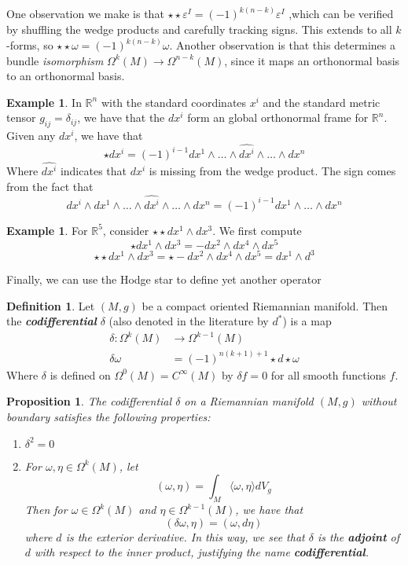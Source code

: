 \documentclass[psamsfonts]{amsart}
\newtheorem{prop}[thm]{Proposition}
\theoremstyle{definition}
\newtheorem{defn}[thm]{Definition}
\newtheorem{exmp}[thm]{Example}
\theoremstyle{remark}
\newcommand{\R}{\mathbb{R}}
\newcommand{\ib}[1]{\textbf{\textit{#1}}}
\begin{document}
One observation we make is that $\star\star \varepsilon^I = (-1)^{k(n-k)}\varepsilon^I$ ,which can be verified by shuffling the wedge products and carefully tracking signs. This extends to all $k$-forms, so $\star \star\omega = (-1)^{k(n-k)}\omega$. Another observation is that this determines a bundle \emph{isomorphism} $\Omega^k(M) \to \Omega^{n-k}(M)$, since it maps an orthonormal basis to an orthonormal basis.
\begin{exmp}
In $\R^n$ with the standard coordinates $x^i$  and the standard metric tensor  $g_{ij} = \delta_{ij}$, we have that the $dx^i$ form an global orthonormal frame for $\R^n$. Given any $dx^i$, we have that 
$$\star dx^i =  (-1)^{i-1} dx^1 \wedge \ldots \wedge \hat{dx^i} \wedge \ldots \wedge dx^n $$
Where $\hat{dx^i}$ indicates that $dx^i$ is missing  from the wedge product. The sign comes from the fact that 
$$dx^i \wedge dx^1 \wedge \ldots \wedge \hat{dx^i} \wedge \ldots \wedge dx^n = (-1)^{i-1} dx^1\wedge \ldots \wedge dx^n$$
\end{exmp}
%
\begin{exmp}
For $\R^5$,  consider $\star\star dx^1 \wedge dx^3$. We first compute
$$\star dx^1 \wedge dx^3 = -dx^2 \wedge dx^4 \wedge dx^5 $$
$$\star\star dx^1\wedge dx^3 = \star -dx^2 \wedge dx^4 \wedge dx^5 = dx^1 \wedge d^3$$
\end{exmp}
%
Finally, we can use the Hodge star to define yet another operator
\begin{defn}
Let $(M,g)$ be a compact oriented Riemannian manifold. Then the \ib{codifferential} $\delta$ (also denoted in the literature by $d^*$) is a map
\begin{align*}
\delta: \Omega^k(M) &\to \Omega^{k-1}(M) \\
\delta \omega &= (-1)^{n(k+1)+1}\star d \star \omega
\end{align*}
Where $\delta$ is  defined on $\Omega^0(M) = C^\infty(M)$ by  $\delta f = 0$ for all smooth functions $f$.
\end{defn}
%
\begin{prop}
The codifferential $\delta$ on  a Riemannian manifold $(M,g)$ without boundary satisfies the following properties:
\begin{enumerate}
\item $\delta^2 = 0$ 
\item For $\omega,\eta \in \Omega^k(M)$, let 
$$(\omega, \eta) = \int_M \langle \omega, \eta \rangle dV_g$$
Then for $\omega \in \Omega^k(M)$ and $\eta \in \Omega^{k-1}(M)$, we have that 
$$(\delta \omega, \eta) = (\omega, d\eta) $$
where $d$ is the exterior derivative. In this way, we see that $\delta$  is the \ib{adjoint} of $d$ with respect to the inner product, justifying the name \ib{codifferential}.
\end{enumerate}
\end{prop}
\end{document}

